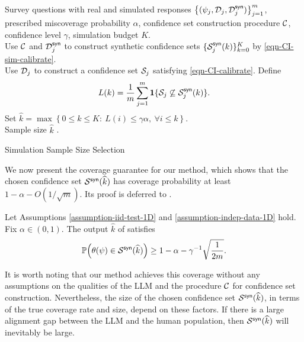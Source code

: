 \begin{algorithm}[h]
	\begin{algorithmic}
	 Survey questions with real and simulated responses $\big\{(\psi_j, \mathcal{D}_j, \mathcal{D}^{\mathsf{syn}}_j)\big\}_{j=1}^m$, prescribed miscoverage probability $\alpha$, confidence set construction procedure $\mathcal{C}$, confidence level $\gamma$, simulation budget $K$. \\[4pt]
		\STATE Use $\mathcal{C}$ and $\mathcal{D}^{\mathsf{syn}}_j$ to construct synthetic confidence sets $\{{\mathcal{S}}^{\mathsf{syn}}_j(k)\}_{k=0}^K$ by \eqref{eqn-CI-sim-calibrate}. \\[4pt]
		\STATE Use $\mathcal{D}_j$ to construct a confidence set ${\mathcal{S}}_j$ satisfying \eqref{eqn-CI-calibrate}.
	\ENDFOR
	\STATE Define
	\[
	L(k) = \frac{1}{m} \sum_{j=1}^m \operatorname{\mathbf{1}} \{ {\mathcal{S}}_j\not\subseteq {\mathcal{S}}^{\mathsf{syn}}_j(k) \}.
	\]
	\STATE Set $\widehat{k} = \max \left\{ 0\le k \le K :~ L(i) \le \gamma\alpha ,~\forall i\le k \right\}$. \\[4pt]
	 Sample size $\widehat{k}$
.	\caption{Simulation Sample Size Selection}
	\label{alg-general}
	\end{algorithmic}
\end{algorithm}

We now present the coverage guarantee for our method, which shows that the chosen confidence set ${\mathcal{S}}^{\mathsf{syn}}(\widehat{k})$ has coverage probability at least $1-\alpha-O(1/\sqrt{m})$. Its proof is deferred to .


\begin{theorem}\label{thm-coverage}
Let Assumptions \ref{assumption-iid-test-1D} and \ref{assumption-indep-data-1D} hold. Fix $\alpha\in(0,1)$. The output $\widehat{k}$ of  satisfies
\[
\mathbb{P}\Big( \theta ( \psi ) \in {\mathcal{S}}^{\mathsf{syn}}(\widehat{k}) \Big) \ge 1-\alpha - \gamma^{-1} \sqrt{\frac{1}{2m}}.
\]
\end{theorem}

It is worth noting that our method achieves this coverage without any assumptions on the qualities of the LLM and the procedure $\mathcal{C}$ for confidence set construction. Nevertheless, the size of the chosen confidence set ${\mathcal{S}}^{\mathsf{syn}}(\widehat{k})$, in terms of the true coverage rate and size, depend on these factors. If there is a large alignment gap between the LLM and the human population, then ${\mathcal{S}}^{\mathsf{syn}}(\widehat{k})$ will inevitably be large.




